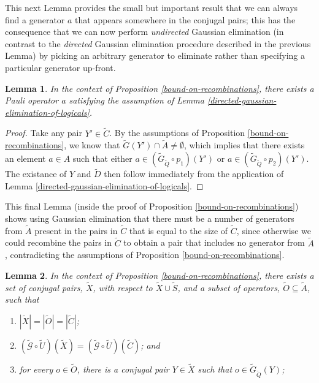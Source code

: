 \documentclass[twocolumn,showpacs,preprintnumbers,amsmath,amssymb,nofootinbib,pra,floatfix]{revtex4-1}
\newtheorem{lemma}{Lemma}
\newenvironment{remark}[1][Remark]{\begin{trivlist}
\item[\hskip \labelsep {\bfseries #1}]}{\end{trivlist}}
\newcommand{\set}{\tilde}
\newcommand{\genfun}{\tilde{\mathcal{G}}}
\begin{document}
\begin{remark}
This next Lemma provides the small but important result that we can always find a generator $a$ that appears somewhere in the conjugal pairs;  this has the consequence that we can now perform \emph{undirected} Gaussian elimination (in contrast to the \emph{directed} Gaussian elimination procedure described in the previous Lemma) by picking an arbitrary generator to eliminate rather than specifying a particular generator up-front.
\end{remark}

\begin{lemma}
\label{undirected-gaussian-elimination-of-logicals}
In the context of Proposition \ref{bound-on-recombinations}, there exists a Pauli operator $a$ satisfying the assumption of Lemma \ref{directed-gaussian-elimination-of-logicals}.
\end{lemma}

\begin{proof}
Take any pair $Y'\in\set C$.  By the assumptions of Proposition \ref{bound-on-recombinations}, we know that $\set G(Y')\cap \set A \ne \emptyset$, which implies that there exists an element $a\in A$ such that either $a\in (\set G_{\set Q}\circ p_1)(Y')$ or $a\in (\set G_{\set Q}\circ p_2)(Y')$.  The existance of $Y$ and $\set D$ then follow immediately from the application of Lemma \ref{directed-gaussian-elimination-of-logicals}.
\end{proof}
\begin{remark}
This final Lemma (inside the proof of Proposition \ref{bound-on-recombinations}) shows using Gaussian elimination that there must be a number of generators from $\set A$ present in the pairs in $\set C$ that is equal to the size of $\set C$, since otherwise we could recombine the pairs in $\set C$ to obtain a pair that includes no generator from $\set A$, contradicting the assumptions of Proposition \ref{bound-on-recombinations}.
\end{remark}
\begin{lemma}
\label{elimination-to-create-subset}
In the context of Proposition \ref{bound-on-recombinations}, there exists a set of conjugal pairs, $\set X$, with respect to $\set X\cup\set S$, and a subset of operators, $\set O\subseteq \set A$, such that
\begin{enumerate}
\item $|\set X|=|\set O|=|\set C|$;
\item $(\genfun\circ\set U)(\set X)=(\genfun\circ\set U)(\set C)$; and
\item for every $o\in\set O$, there is a conjugal pair $Y\in\set X$ such that $o\in\set G_{\set Q}(Y)$;
\end{enumerate}
\end{lemma}
\end{document}
